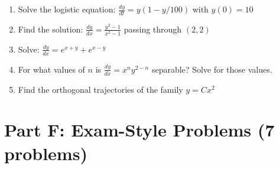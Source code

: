\documentclass[12pt]{article}
\begin{document}
\begin{enumerate}[resume]
\item Solve the logistic equation: $\frac{dy}{dt} = y(1-y/100)$ with $y(0) = 10$

\item Find the solution: $\frac{dy}{dx} = \frac{y^2 - 1}{x^2 - 1}$ passing through $(2, 2)$

\item Solve: $\frac{dy}{dx} = e^{x+y} + e^{x-y}$

\item For what values of $n$ is $\frac{dy}{dx} = x^n y^{2-n}$ separable? Solve for those values.

\item Find the orthogonal trajectories of the family $y = Cx^2$
\end{enumerate}

\section*{Part F: Exam-Style Problems (7 problems)}
\end{document}
